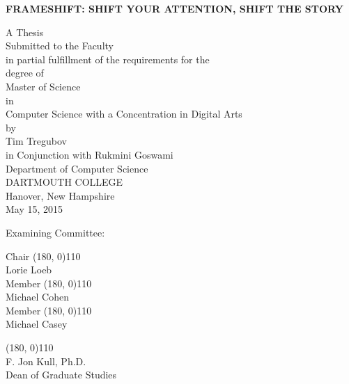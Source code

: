 \pagestyle{plain}
\begin{center}
\textbf{FRAMESHIFT: SHIFT YOUR ATTENTION, SHIFT THE STORY}
\vspace{0.4cm}

A Thesis\\ [0.4cm]
Submitted to the Faculty \\ [0.4cm]
in partial fulfillment of the requirements for the \\[0.4cm]
degree of \\[0.4cm]
Master of Science\\in\\Computer Science with a Concentration in Digital Arts\\[0.4cm]
by\\[0.5cm]
Tim Tregubov\\[0.4cm]
in Conjunction with Rukmini Goswami \\[0.5cm]
Department of Computer Science \\ [0.4cm]
DARTMOUTH COLLEGE \\ [0.4cm]
Hanover, New Hampshire \\[0.4cm]
May 15, 2015 %
\vspace{1.5cm}

\end{center}

Examining Committee:

\begin{flushright}
Chair \line(180, 0){110} \\
Lorie Loeb\\[1cm]

Member \line(180, 0){110} \\
Michael Cohen \\[1cm]

Member \line(180, 0){110} \\
Michael Casey \\[1cm]



\end{flushright}

\begin{flushleft}
\line(180, 0){110} \\
F. Jon Kull, Ph.D.\\
Dean of Graduate Studies\\[1cm]
\end{flushleft}






